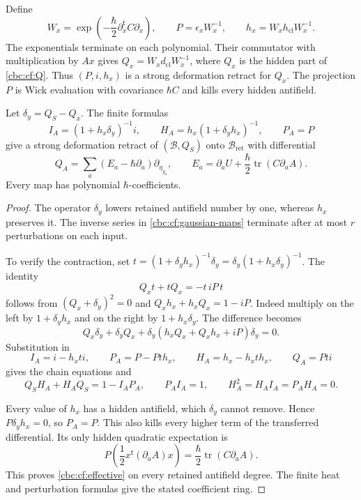 Define
\begin{equation}\label{cbc:cf:heat}
 W_x=\exp\left(-\frac{\hbar}{2}
                    \partial_x^{\mathsf t}C\partial_x\right),
 \qquad P=\epsilon_xW_x^{-1},\qquad
 h_x=W_xh_{\mathrm{cl}}W_x^{-1}.
\end{equation}
The exponentials terminate on each polynomial. Their commutator
with multiplication by $Ax$ gives
$Q_x=W_xd_{\mathrm{cl}}W_x^{-1}$, where $Q_x$ is the hidden
part of \eqref{cbc:cf:Q}. Thus $(P,i,h_x)$ is a strong
deformation retract for $Q_x$. The projection $P$ is Wick
evaluation with covariance $\hbar C$ and kills every hidden
antifield.

\begin{theorem}\label{cbc:cf:gaussian-sdr}
Let $\delta_y=Q_S-Q_x$. The finite formulas
\begin{equation}\label{cbc:cf:gaussian-maps}
 I_A=(1+h_x\delta_y)^{-1}i,\qquad
 H_A=h_x(1+\delta_yh_x)^{-1},\qquad P_A=P
\end{equation}
give a strong deformation retract of $(\mathcal B,Q_S)$ onto
$\mathcal B_{\mathrm{ret}}$ with differential
\begin{equation}\label{cbc:cf:effective}
 Q_A=\sum_a(E_a-\hbar\partial_a)\partial_{\eta_{y_a}},
 \qquad
 E_a=\partial_aU+\frac{\hbar}{2}\operatorname{tr}(C\partial_aA).
\end{equation}
Every map has polynomial $\hbar$-coefficients.
\end{theorem}
\begin{proof}
The operator $\delta_y$ lowers retained antifield number by one,
whereas $h_x$ preserves it. The inverse series in
\eqref{cbc:cf:gaussian-maps} terminate after at most $r$
perturbations on each input.

To verify the contraction, set
$t=(1+\delta_yh_x)^{-1}\delta_y
  =\delta_y(1+h_x\delta_y)^{-1}$.
The identity
\[
 Q_xt+tQ_x=-t\,iP\,t
\]
follows from $(Q_x+\delta_y)^2=0$ and
$Q_xh_x+h_xQ_x=1-iP$.
Indeed multiply on the left by $1+\delta_yh_x$ and on
the right by $1+h_x\delta_y$. The difference becomes
\[
 Q_x\delta_y+\delta_yQ_x+
 \delta_y(h_xQ_x+Q_xh_x+iP)\delta_y=0.
\]
Substitution in
\[
 I_A=i-h_xti,\qquad P_A=P-Pth_x,\qquad
 H_A=h_x-h_xth_x,\qquad Q_A=Pti
\]
gives the chain equations and
\[
 Q_SH_A+H_AQ_S=1-I_AP_A,\qquad
 P_AI_A=1,\qquad H_A^2=H_AI_A=P_AH_A=0.
\]

Every value of $h_x$ has a hidden antifield, which $\delta_y$
cannot remove. Hence $P\delta_yh_x=0$, so $P_A=P$.
This also kills every higher term of the transferred
differential. Its only hidden quadratic expectation is
\[
 P\left(\frac12x^{\mathsf t}(\partial_aA)x\right)
             =\frac{\hbar}{2}\operatorname{tr}(C\partial_aA).
\]
This proves \eqref{cbc:cf:effective} on every retained
antifield degree. The finite heat and perturbation formulas
give the stated coefficient ring.
\end{proof}

